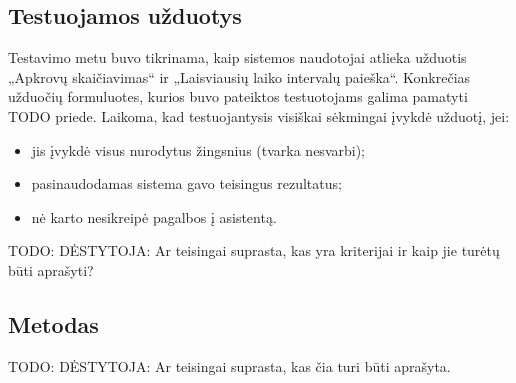 


\subsection{Testuojamos užduotys}

Testavimo metu buvo tikrinama, kaip sistemos naudotojai atlieka užduotis
„Apkrovų skaičiavimas“ ir „Laisviausių laiko intervalų paieška“.
Konkrečias užduočių formuluotes, kurios buvo pateiktos testuotojams
galima pamatyti TODO priede. Laikoma, kad testuojantysis visiškai sėkmingai
įvykdė užduotį, jei:
\begin{itemize}
  \item jis įvykdė visus nurodytus žingsnius (tvarka nesvarbi);
  \item pasinaudodamas sistema gavo teisingus rezultatus;
  \item nė karto nesikreipė pagalbos į asistentą.
\end{itemize}
TODO: DĖSTYTOJA: Ar teisingai suprasta, kas yra kriterijai ir kaip jie
turėtų būti aprašyti?

\subsection{Metodas}

TODO: DĖSTYTOJA: Ar teisingai suprasta, kas čia turi būti aprašyta.

